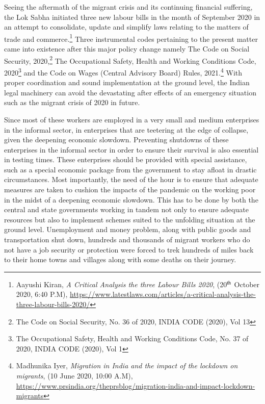 \begin{multicols}{2}
\noi
Seeing the aftermath of the migrant crisis and its continuing financial suffering, the Lok
Sabha initiated three new labour bills in the month of September 2020 in an attempt to
consolidate, update and simplify laws relating to the matters of trade and commerce.\footnote{Aayushi Kiran, \textit{A Critical Analysis the three Labour Bills 2020}, (20$^{\rm th}$ October 2020, 6:40 P.M),
\url{https://www.latestlaws.com/articles/a-critical-analysis-the-three-labour-bills-2020/}} Three
instrumental codes pertaining to the present matter came into existence after this major policy change namely The Code on Social Security, 2020,\footnote{The Code on Social Security, No. 36 of 2020, INDIA CODE (2020), Vol 13} The Occupational Safety, Health and
Working Conditions Code, 2020\footnote{The Occupational Safety, Health and Working Conditions Code, No. 37 of 2020, INDIA CODE (2020), Vol 1} and the Code on Wages (Central Advisory Board) Rules,
2021.\footnote{Madhunika Iyer, \textit{Migration in India and the impact of the lockdown on migrants}, (10 June 2020, 10:00 A.M),
\url{https://www.prsindia.org/theprsblog/migration-india-and-impact-lockdown-migrants}} With proper coordination and sound implementation at the ground level, the Indian
legal machinery can avoid the devastating after effects of an emergency situation such as the
migrant crisis of 2020 in future. 



\noi
Since most of these workers are employed in a very small and medium enterprises in the
informal sector, in enterprises that are teetering at the edge of collapse, given the deepening
economic slowdown. Preventing shutdowns of these enterprises in the informal sector in
order to ensure their survival is also essential in testing times. These enterprises should be
provided with special assistance, such as a special economic package from the government to
stay afloat in drastic circumstances. Most importantly, the need of the hour is to ensure that
adequate measures are taken to cushion the impacts of the pandemic on the working poor in
the midst of a deepening economic slowdown. This has to be done by both the central and
state governments working in tandem not only to ensure adequate resources but also to
implement schemes suited to the unfolding situation at the ground level. Unemployment and
money problem, along with public goods and transportation shut down, hundreds and
thousands of migrant workers who do not have a job security or protection were forced to
trek hundreds of miles back to their home towns and villages along with some deaths on their
journey. 


\end{multicols}
